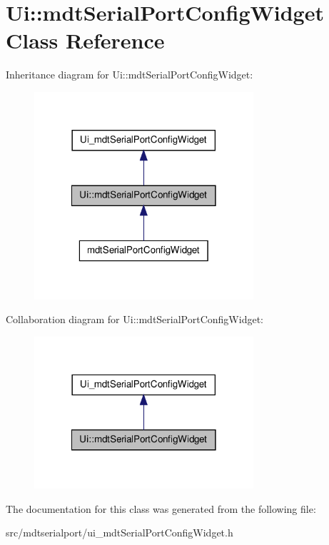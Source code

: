 \hypertarget{class_ui_1_1mdt_serial_port_config_widget}{
\section{Ui::mdtSerialPortConfigWidget Class Reference}
\label{class_ui_1_1mdt_serial_port_config_widget}
}


Inheritance diagram for Ui::mdtSerialPortConfigWidget:\nopagebreak
\begin{figure}[H]
\begin{center}
\leavevmode
\includegraphics[width=230pt]{class_ui_1_1mdt_serial_port_config_widget__inherit__graph}
\end{center}
\end{figure}


Collaboration diagram for Ui::mdtSerialPortConfigWidget:\nopagebreak
\begin{figure}[H]
\begin{center}
\leavevmode
\includegraphics[width=230pt]{class_ui_1_1mdt_serial_port_config_widget__coll__graph}
\end{center}
\end{figure}


The documentation for this class was generated from the following file:\begin{DoxyCompactItemize}
\item 
src/mdtserialport/ui\_\-mdtSerialPortConfigWidget.h\end{DoxyCompactItemize}
